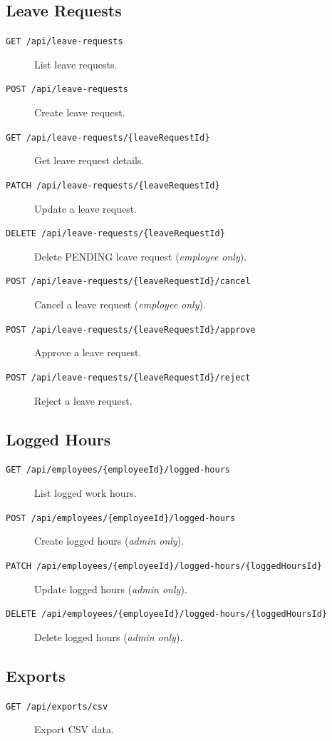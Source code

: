 \documentclass[11pt,a4paper]{article}
\begin{document}
\subsection{Leave Requests}
\begin{description}
    \item[\texttt{GET /api/leave-requests}] List leave requests.
    \item[\texttt{POST /api/leave-requests}] Create leave request.
    \item[\texttt{GET /api/leave-requests/\{leaveRequestId\}}] Get leave request details.
    \item[\texttt{PATCH /api/leave-requests/\{leaveRequestId\}}] Update a leave request.
    \item[\texttt{DELETE /api/leave-requests/\{leaveRequestId\}}] Delete PENDING leave request (\textit{employee only}).
    \item[\texttt{POST /api/leave-requests/\{leaveRequestId\}/cancel}] Cancel a leave request (\textit{employee only}).
    \item[\texttt{POST /api/leave-requests/\{leaveRequestId\}/approve}] Approve a leave request.
    \item[\texttt{POST /api/leave-requests/\{leaveRequestId\}/reject}] Reject a leave request.
\end{description}

\subsection{Logged Hours}
\begin{description}
    \item[\texttt{GET /api/employees/\{employeeId\}/logged-hours}] List logged work hours.
    \item[\texttt{POST /api/employees/\{employeeId\}/logged-hours}] Create logged hours (\textit{admin only}).
    \item[\texttt{PATCH /api/employees/\{employeeId\}/logged-hours/\{loggedHoursId\}}] Update logged hours (\textit{admin only}).
    \item[\texttt{DELETE /api/employees/\{employeeId\}/logged-hours/\{loggedHoursId\}}] Delete logged hours (\textit{admin only}).
\end{description}

\subsection{Exports}
\begin{description}
    \item[\texttt{GET /api/exports/csv}] Export CSV data.
\end{description}
\end{document}

